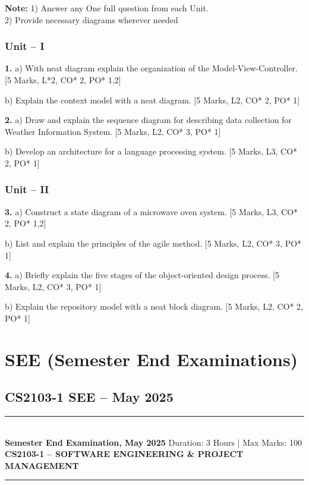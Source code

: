 \documentclass[11pt,a4paper]{article}
\newcommand{\examheader}[4]{
\noindent\rule{\textwidth}{0.5pt}\\
\textbf{#1} \hfill Duration: #3 | Max Marks: #4\\
\textbf{#2}\\
\rule{\textwidth}{0.5pt}
\vspace{0.2cm}
}
\begin{document}
\textbf{Note:} 1) Answer any One full question from each Unit.\\
2) Provide necessary diagrams wherever needed

\subsubsection*{Unit -- I}

\textbf{1.} a) With neat diagram explain the organization of the Model-View-Controller. \hfill [5 Marks, L*2, CO* 2, PO* 1,2]

b) Explain the context model with a neat diagram. \hfill [5 Marks, L2, CO* 2, PO* 1]

\textbf{2.} a) Draw and explain the sequence diagram for describing data collection for Weather Information System. \hfill [5 Marks, L2, CO* 3, PO* 1]

b) Develop an architecture for a language processing system. \hfill [5 Marks, L3, CO* 2, PO* 1]

\subsubsection*{Unit -- II}

\textbf{3.} a) Construct a state diagram of a microwave oven system. \hfill [5 Marks, L3, CO* 2, PO* 1,2]

b) List and explain the principles of the agile method. \hfill [5 Marks, L2, CO* 3, PO* 1]

\textbf{4.} a) Briefly explain the five stages of the object-oriented design process. \hfill [5 Marks, L2, CO* 3, PO* 1]

b) Explain the repository model with a neat block diagram. \hfill [5 Marks, L2, CO* 2, PO* 1]

\vspace{0.5cm}

\section{SEE (Semester End Examinations)}

\subsection{CS2103-1 SEE -- May 2025}
\examheader{Semester End Examination, May 2025}{CS2103-1 -- SOFTWARE ENGINEERING \& PROJECT MANAGEMENT}{3 Hours}{100}
\end{document}
